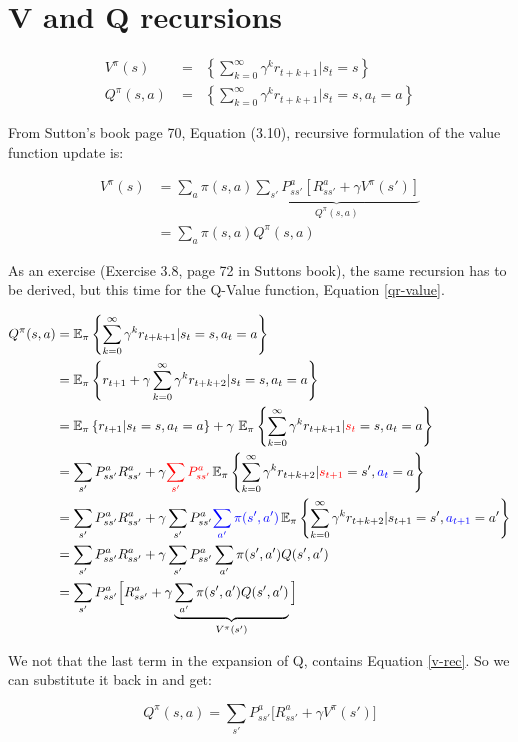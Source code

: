 \documentclass[a4paper,10pt]{article}
\DeclareMathOperator*{\E}{\mathbb{E}_{\pi}}   %
\newcommand{\Ps}{ P_{ss'}^a}   %
\newcommand{\R}{ R_{ss'}^a}   %
\begin{document}
\section*{V and Q recursions}

\begin{align}
 V^{\pi}(s)   &= \E \left\{ \sum\limits_{k=0}^{\infty} \gamma^k r_{t+k+1} | s_t = s \right\} \label{vr-value} \\ 
 Q^{\pi}(s,a) &= \E \left\{ \sum\limits_{k=0}^{\infty} \gamma^k r_{t+k+1} | s_t = s, a_t = a \right\} \label{qr-value}
\end{align}

From Sutton's book page 70, Equation (3.10), recursive formulation of the value function update is:

\begin{align}
 V^{\pi}(s) &= \sum\limits_a \pi(s,a) \underbrace{\sum\limits_{s'} \Ps \left[ \R + \gamma V^{\pi}(s')\right]}_{Q^{\pi}(s,a)} \\
	    &= \sum\limits_a \pi(s,a) Q^{\pi}(s,a) \label{v-rec}
\end{align}

As an exercise (Exercise 3.8, page 72 in Suttons book), the same recursion has to be derived, but this time for
the Q-Value function, Equation \ref{qr-value}.

\begin{align*}
 Q^{\pi}(s,a) &= \E \left\{ \sum\limits_{k=0}^{\infty} \gamma^k  r_{t+k+1}  | s_t = s, a_t = a \right\}  \\
	      &= \E \left\{ r_{t+1} + \gamma \sum\limits_{k=0}^{\infty} \gamma^k r_{t+k+2} | s_t = s, a_t = a \right\} \\
	      &= \E \left\{ r_{t+1} |  s_t = s, a_t = a \right\} + \gamma\, \E \left\{ \sum\limits_{k=0}^{\infty} \gamma^k r_{t+k+1} | \textcolor{red}{s_{t}} = s, a_{t} = a  \right\} \\
	      &= \sum\limits_{s'} \Ps \R  		 + \gamma \textcolor{red}{\sum\limits_{s'} \Ps} \E \left\{ \sum\limits_{k=0}^{\infty} \gamma^k r_{t+k+2} |  \textcolor{red}{s_{t+1}} = s', \textcolor{blue}{a_{t}} = a  \right\} \\
	      &= \sum\limits_{s'} \Ps \R 		 + \gamma \sum\limits_{s'} \Ps  \textcolor{blue}{ \sum\limits_{a'} \pi(s',a')} \E \left\{ \sum\limits_{k=0}^{\infty} \gamma^k r_{t+k+2}  |  s_{t+1} = s', \textcolor{blue}{a_{t+1}} = a'  \right\} \\
      	      &= \sum\limits_{s'} \Ps \R 		 + \gamma \sum\limits_{s'} \Ps  \sum\limits_{a'} \pi(s',a') Q(s',a')  \\
      	      &= \sum\limits_{s'} \Ps \Big[ \R	  	 + \gamma \underbrace{ \sum\limits_{a'} \pi(s',a') Q(s',a')}_{V^{\pi}(s')} \Big] 
\end{align*}

We not that the last term in the expansion of Q, contains Equation \ref{v-rec}. So we can substitute it back in and get:


\begin{equation}
  Q^{\pi}(s,a) = \sum\limits_{s'} \Ps \Big[ \R	 + \gamma V^{\pi}(s')  \Big] 
\end{equation}
\end{document}
